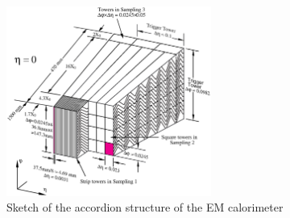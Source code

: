 \begin{figure}[h]
\begin{center}
\includegraphics*[width=0.60\textwidth] {figures/figure1-2}%
\caption[Sketch of the accordion structure of the EM calorimeter]{Sketch of the accordion structure of the EM calorimeter}
\label{fig:LAr_gran}
\end{center}
\end{figure}

